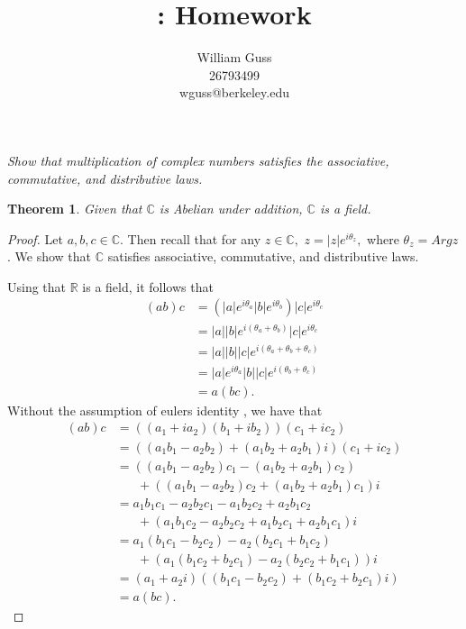 \documentclass[letter]{article}
\title{\bCLASS: Homework \bHWN}
\author{William Guss\\26793499\\wguss@berkeley.edu}
\newtheorem{theorem}{Theorem}
\newenvironment{menumerate}{%
  \edef\backupindent{\the\parindent}%
  \enumerate%
  \setlength{\parindent}{\backupindent}%
}{\endenumerate}
\begin{document}
\maketitle
\thispagestyle{empty}


\begin{menumerate}
    \item \emph{Show that multiplication of complex numbers satisfies the associative,
commutative, and distributive laws.}
    \begin{theorem}
        Given that $\mathbb{C}$ is Abelian under addition, $\mathbb{C}$ is a field.
    \end{theorem}
    \begin{proof}
        Let $a,b,c \in \mathbb{C}.$ Then recall that for any $z \in \mathbb{C},$  
        $z = |z|e^{i\theta_z},$ where $\theta_z = Arg z$. We show that $\mathbb{C}$
        satisfies associative, commutative, and distributive laws.

        Using that $\mathbb{R}$ is a field, it follows that 
        \begin{equation}
            \begin{aligned}
                (ab)c &= (|a|e^{i\theta_a}|b|e^{i\theta_b})|c|e^{i\theta_c} \\
                    &= |a||b|e^{i(\theta_a+\theta_b)}|c|e^{i\theta_c} \\ 
                    &= |a||b||c|e^{i(\theta_a+\theta_b +\theta_c)} \\
                    &= |a|e^{i\theta_a}|b||c|e^{i(\theta_b + \theta_c)} \\
                    &= a(bc).
            \end{aligned}
        \end{equation}
        Without the assumption of eulers identity  , we have that
        \begin{equation}
            \begin{aligned}
                (ab)c &= ((a_1+ia_2)(b_1 +ib_2))(c_1+ic_2) \\
                      &= ((a_1b_1 - a_2b_2) + (a_1b_2 + a_2b_1)i)(c_1+ic_2) \\
                      &= ((a_1b_1 - a_2b_2)c_1 - (a_1b_2 + a_2b_1)c_2) \\
                      &\;\;\;\;\;\;+ ((a_1b_1 - a_2b_2)c_2 + (a_1b_2 + a_2b_1)c_1)i \\
                      &= a_1b_1c_1 - a_2b_2c_1 - a_1b_2c_2 + a_2b_1c_2 \\
                      &\;\;\;\;\;\;+ (a_1b_1c_2 - a_2b_2c_2 + a_1b_2c_1 + a_2b_1c_1)i \\
                      &= a_1(b_1c_1 - b_2c_2) - a_2(b_2c_1  + b_1c_2) \\
                      &\;\;\;\;\;\;+ (a_1(b_1c_2 + b_2c_1) - a_2(b_2c_2 + b_1c_1))i \\
                      &=(a_1+a_2i)((b_1c_1 - b_2c_2) + (b_1c_2 + b_2c_1)i) \\
                      &= a(bc).
            \end{aligned}
        \end{equation}


\end{proof}
\end{menumerate}
\end{document}
